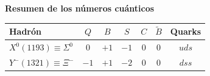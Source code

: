 \begin{problema}
\textbf{Resumen de los números cuánticos}

\begin{center}
    \begin{tabular}{lcccccc}
        \toprule
        \textbf{Hadrón} & \textbf{$Q$} & \textbf{$B$} & \textbf{$S$} & \textbf{$C$} & \textbf{$\tilde{B}$} & \textbf{Quarks} \\
        \midrule
        $X^0(1193) \equiv \Sigma^0$ & $0$ & $+1$ & $-1$ & $0$ & $0$ & $uds$ \\
        $Y^-(1321) \equiv \Xi^-$ & $-1$ & $+1$ & $-2$ & $0$ & $0$ & $dss$ \\
        \bottomrule
    \end{tabular}
    \label{tab:numeros_cuanticos_19}
\end{center}

\end{problema}

\newpage

